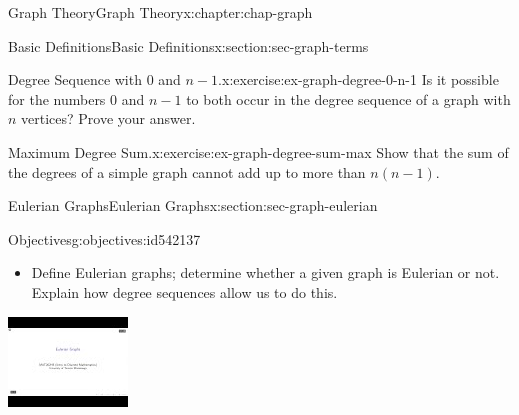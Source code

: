 \documentclass[oneside,10pt,]{book}
\numberwithin{equation}{section}
\newlength{\qrsize}
\newlength{\previewwidth}
\begin{document}
\begin{chapterptx}{Graph Theory}{}{Graph Theory}{}{}{x:chapter:chap-graph}
\begin{sectionptx}{Basic Definitions}{}{Basic Definitions}{}{}{x:section:sec-graph-terms}
\begin{inlineexercise}{Degree Sequence with 0 and \(n-1\).}{x:exercise:ex-graph-degree-0-n-1}%
Is it possible for the numbers \(0\) and \(n-1\) to both occur in the degree sequence of a graph with \(n\) vertices? Prove your answer.%
\end{inlineexercise}%
\begin{inlineexercise}{Maximum Degree Sum.}{x:exercise:ex-graph-degree-sum-max}%
Show that the sum of the degrees of a simple graph cannot add up to more than \(n(n-1)\).%
\end{inlineexercise}%
\end{sectionptx}
%
%
\typeout{************************************************}
\typeout{************************************************}
%
\begin{sectionptx}{Eulerian Graphs}{}{Eulerian Graphs}{}{}{x:section:sec-graph-eulerian}
\begin{objectives}{Objectives}{g:objectives:id542137}
%
\begin{itemize}[label=\textbullet]
\item{}Define Eulerian graphs; determine whether a given graph is Eulerian or not. Explain how degree sequences allow us to do this.%
\end{itemize}
\end{objectives}
\begin{sidebyside}{1}{0}{0}{0}%
\begin{sbspanel}{1}%
\setlength{\qrsize}{9em}
\setlength{\previewwidth}{\linewidth}
\addtolength{\previewwidth}{-\qrsize}
\begin{tcbraster}[raster columns=2, raster column skip=1pt, raster halign=center, raster force size=false, raster left skip=0pt, raster right skip=0pt]%
\begin{tcolorbox}[previewstyle, width=\previewwidth]%
\includegraphics[width=0.80\linewidth,height=\qrsize,keepaspectratio]{images/video-eulerian.jpg}%

\end{tcolorbox}
\end{tcbraster}
\end{sbspanel}
\end{sidebyside}
\end{sectionptx}
\end{chapterptx}
\end{document}

